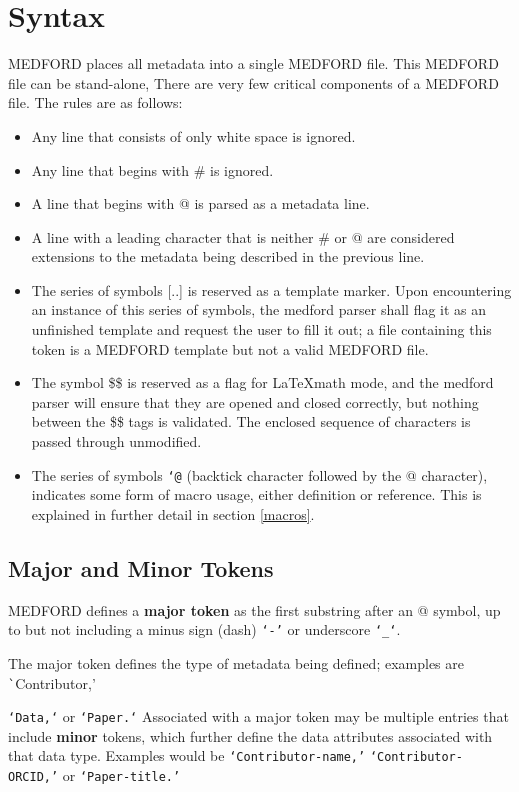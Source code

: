 \documentclass[10pt]{article}
\begin{document}
\section{Syntax} \label{syntax}{
MEDFORD places all metadata into a single MEDFORD file. This MEDFORD file can be stand-alone, 
    There are very few critical components of a MEDFORD file. The rules are as follows:
    \begin{itemize}
        \item Any line that consists of only white space is ignored.
        \item Any line that begins with \# is ignored.
        \item A line that begins with @ is parsed as a metadata line.
        \item A line with a leading character that is neither \# or @ are considered extensions to the metadata being described in the previous line.
        
        \item The series of symbols [..] is reserved as a template marker. Upon encountering an instance of this series of symbols, the medford parser shall flag it as an unfinished template and request the user to fill it out; a file containing this token is a MEDFORD template but not a valid MEDFORD file.
        \item The symbol \$\$ is reserved as a flag for \LaTeX math mode, and the medford parser will ensure that they are opened and closed correctly, but nothing between the \$\$ tags is validated. The enclosed sequence of characters is passed through unmodified.
        \item The series of symbols \texttt{`@} (backtick character followed by the @ character), indicates some form of macro usage, either definition or reference. This is explained in further detail in section \ref{macros}.
    \end{itemize}
    
    \subsection{Major and Minor Tokens}
    
    MEDFORD defines a \textbf{major token} as the first substring after an @ symbol, up to but not including a minus sign (dash) \texttt{`-'} or underscore \texttt{`\_`}.
    
    The major token defines the type of metadata being defined; examples are \texttt`Contributor,'} \texttt{`Data,`} or \texttt{`Paper.`} Associated with a major token may be multiple entries that include \textbf{minor} tokens, which further define the data attributes associated with that data type. Examples would be \texttt{`Contributor-name,'} \texttt{`Contributor-ORCID,'} or \texttt{`Paper-title.'}
    
\end{document}

